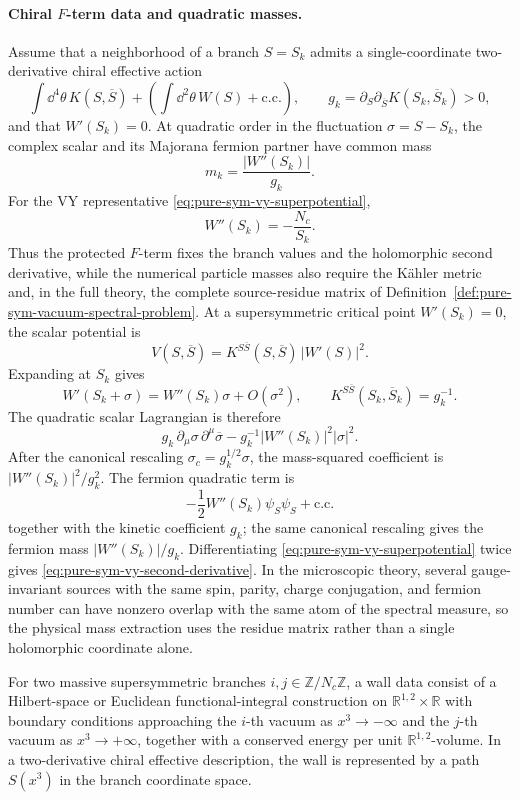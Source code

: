 \paragraph{Chiral \(F\)-term data and quadratic masses.}
Assume that a neighborhood of a branch \(S=S_k\) admits a single-coordinate
two-derivative chiral effective action
\[
  \int\dd^4\theta\,K(S,\overline S)
  +
  \left(\int\dd^2\theta\,W(S)+\mathrm{c.c.}\right),
  \qquad
  g_k=\partial_S\partial_{\overline S}K(S_k,\overline S_k)>0,
\]
and that \(W'(S_k)=0\).  At quadratic order in the fluctuation
\(\sigma=S-S_k\), the complex scalar and its Majorana fermion partner have
common mass
\begin{equation}
  m_k=\frac{|W''(S_k)|}{g_k}.
  \label{eq:pure-sym-single-chiral-mass}
\end{equation}
For the VY representative
\eqref{eq:pure-sym-vy-superpotential},
\begin{equation}
  W''(S_k)=-\frac{N_c}{S_k}.
  \label{eq:pure-sym-vy-second-derivative}
\end{equation}
Thus the protected \(F\)-term fixes the branch values and the holomorphic
second derivative, while the numerical particle masses also require the
Kähler metric and, in the full theory, the complete source-residue matrix of
Definition~\ref{def:pure-sym-vacuum-spectral-problem}.
At a supersymmetric critical point \(W'(S_k)=0\), the scalar potential is
\[
  V(S,\overline S)=
  K^{S\overline S}(S,\overline S)\,|W'(S)|^2 .
\]
Expanding at \(S_k\) gives
\[
  W'(S_k+\sigma)=W''(S_k)\sigma+O(\sigma^2),
  \qquad
  K^{S\overline S}(S_k,\overline S_k)=g_k^{-1}.
\]
The quadratic scalar Lagrangian is therefore
\[
  g_k\,\partial_\mu\sigma\,\partial^\mu\overline\sigma
  -
  g_k^{-1}|W''(S_k)|^2|\sigma|^2 .
\]
After the canonical rescaling \(\sigma_c=g_k^{1/2}\sigma\), the mass-squared
coefficient is \(|W''(S_k)|^2/g_k^2\).  The fermion quadratic term is
\[
  -\frac12 W''(S_k)\psi_S\psi_S+\mathrm{c.c.}
\]
together with the kinetic coefficient \(g_k\); the same canonical rescaling
gives the fermion mass \(|W''(S_k)|/g_k\).  Differentiating
\eqref{eq:pure-sym-vy-superpotential} twice gives
\eqref{eq:pure-sym-vy-second-derivative}.  In the microscopic theory, several
gauge-invariant sources with the same spin, parity, charge conjugation, and
fermion number can have nonzero overlap with the same atom of the spectral
measure, so the physical mass extraction uses the residue matrix rather than
a single holomorphic coordinate alone.

\begin{definition}
\label{def:pure-sym-wall-data}
For two massive supersymmetric branches \(i,j\in\mathbb Z/N_c\mathbb Z\), a
wall data consist of a Hilbert-space or Euclidean functional-integral
construction on \(\mathbb R^{1,2}\times\mathbb R\) with boundary conditions
approaching the \(i\)-th vacuum as \(x^3\to-\infty\) and the \(j\)-th vacuum
as \(x^3\to+\infty\), together with a conserved energy per unit
\(\mathbb R^{1,2}\)-volume.  In a two-derivative chiral effective
description, the wall is represented by a path \(S(x^3)\) in the branch
coordinate space.
\end{definition}


